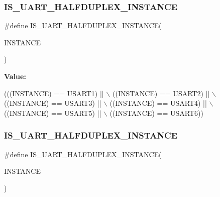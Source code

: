 \subsubsection{\texorpdfstring{I\+S\+\_\+\+U\+A\+R\+T\+\_\+\+H\+A\+L\+F\+D\+U\+P\+L\+E\+X\+\_\+\+I\+N\+S\+T\+A\+N\+CE}{IS\_UART\_HALFDUPLEX\_INSTANCE}\hspace{0.1cm}{\footnotesize\ttfamily [4/13]}}
{\footnotesize\ttfamily \#define I\+S\+\_\+\+U\+A\+R\+T\+\_\+\+H\+A\+L\+F\+D\+U\+P\+L\+E\+X\+\_\+\+I\+N\+S\+T\+A\+N\+CE(\begin{DoxyParamCaption}\item[{}]{I\+N\+S\+T\+A\+N\+CE }\end{DoxyParamCaption})}

{\bfseries Value\+:}
\begin{DoxyCode}
(((INSTANCE) == USART1) || \(\backslash\)
                                                 ((INSTANCE) == USART2) || \(\backslash\)
                                                 ((INSTANCE) == USART3) || \(\backslash\)
                                                 ((INSTANCE) == USART4) || \(\backslash\)
                                                 ((INSTANCE) == USART5) || \(\backslash\)
                                                 ((INSTANCE) == USART6))
\end{DoxyCode}
\mbox{\label{group___exported__macro_ga69c4aa0c561c4c39c621710fbbb0cb7b}} 
\subsubsection{\texorpdfstring{I\+S\+\_\+\+U\+A\+R\+T\+\_\+\+H\+A\+L\+F\+D\+U\+P\+L\+E\+X\+\_\+\+I\+N\+S\+T\+A\+N\+CE}{IS\_UART\_HALFDUPLEX\_INSTANCE}\hspace{0.1cm}{\footnotesize\ttfamily [5/13]}}
{\footnotesize\ttfamily \#define I\+S\+\_\+\+U\+A\+R\+T\+\_\+\+H\+A\+L\+F\+D\+U\+P\+L\+E\+X\+\_\+\+I\+N\+S\+T\+A\+N\+CE(\begin{DoxyParamCaption}\item[{}]{I\+N\+S\+T\+A\+N\+CE }\end{DoxyParamCaption})}

